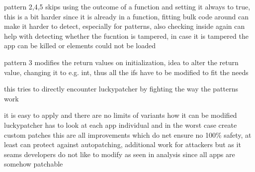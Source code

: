 pattern 2,4,5 skips using the outcome of a function and setting it always to true, this is a bit harder since it is already in a function, fitting bulk code around can make it harder to detect, especially for patterns, also checking inside again can help with detecting whether the fucntion is tampered, in case it is tampered the app can be killed or elements could not be loaded

pattern 3 modifies the return values on initialization, idea to alter the return value, changing it to e.g. int, thus all the ifs have to be modified to fit the needs


this tries to directly encounter luckypatcher by fighting the way the patterns work

it is easy to apply and there are no limits of variants how it can be modified
luckypatcher has to look at each app individual and in the worst case create custom patches
this are all improvements which do net ensure no 100\% safety, at least can protect against autopatching, additional work for attackers
but as it seams developers do not like to modify as seen in analysis since all apps are somehow patchable
